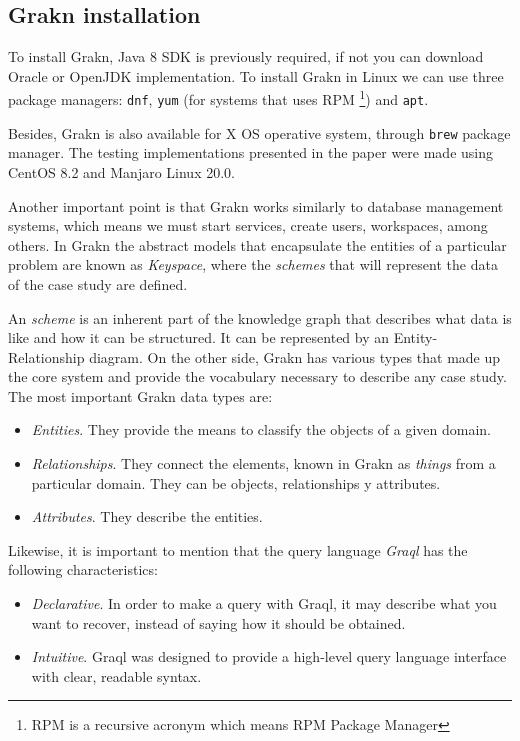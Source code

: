\subsection{Grakn installation} %

To install Grakn, Java 8 SDK is previously required, if not you can download 
Oracle or OpenJDK implementation. To install Grakn in Linux we can use three 
package managers: \texttt{dnf}, \texttt{yum} (for systems that uses RPM
\footnote{RPM is a recursive acronym which means RPM Package Manager}) 
and \texttt{apt}.

Besides, Grakn is also available for X OS operative system,  through 
\texttt{brew} package manager. The testing implementations presented in the 
paper were made using CentOS 8.2 and Manjaro Linux 20.0.

Another important point is that Grakn works similarly to database management 
systems, which means we must start services, create users, workspaces, 
among others. In Grakn the abstract models that encapsulate 
the entities of a particular problem are known as \textit{Keyspace}, where the 
\textit{schemes} that will represent the data of the case study are defined.

An \textit{scheme} is an inherent part of the knowledge graph that describes 
what data is like and how it can be structured. It can be represented by an 
Entity-Relationship diagram. On the other side, Grakn has various types that 
made up the core system and provide the vocabulary necessary to describe any 
case study. The most important Grakn data types are:

\begin{itemize}
    \item \textit{Entities}. They provide the means to classify the objects of 
    a given domain.
    \item \textit{Relationships}. They connect the elements, known in Grakn as 
        \textit{things} from a particular domain. They can be objects, 
        relationships y attributes.
    \item \textit{Attributes}. They describe the entities.
\end{itemize}

Likewise, it is important to mention that the query language \textit{Graql} 
has the following characteristics:

\begin{itemize}
    \item \textit{Declarative}. In order to make a query with Graql, it may 
        describe what you want to recover, instead of saying how it should be 
        obtained.
    \item \textit{Intuitive}. Graql was designed to provide a high-level 
        query language interface with clear, readable syntax.
\end{itemize}

